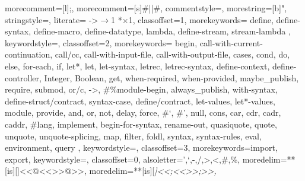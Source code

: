  {
	morecomment=[l]{;},         %
	morecomment=[s]{\#|}{|\#},  %
	commentstyle={\color{ForestGreen}\slshape\sffamily},
	morestring=[b]",
	stringstyle=\color{red},
	literate=%
		{->}{{$\rightarrow$}}1
		{*}{{$\times$}}1,
	classoffset=1,
		morekeywords={
			define, define-syntax, define-macro, define-datatype, lambda, define-stream, stream-lambda
		},
		keywordstyle=\color{purple},
	classoffset=2,
		morekeywords={
			begin, call-with-current-continuation, call/cc, call-with-input-file, call-with-output-file, 
			cases, cond, do, else, for-each, if,
			let*, let, let-syntax, letrec, letrec-syntax,
			define-context, define-controller, Integer, Boolean, get, when-required, when-provided,
			maybe_publish, require, submod, or/c, ->, \#\%module-begin, always_publish, with-syntax, define-struct/contract, syntax-case, define/contract,
			let-values, let*-values,
			module, provide,
			and, or, not, 
			delay, force,
			\#`, \#',
			null, cons, car, cdr, cadr, caddr,
			\#lang, implement, begin-for-syntax, rename-out,
			quasiquote, quote, unquote, unquote-splicing,
			map, filter, foldl, syntax, syntax-rules, eval, environment, query 
		},
		keywordstyle=\color{blue},
	classoffset=3,
		morekeywords={import, export},
		keywordstyle=\color{green},
	classoffset=0,
	alsoletter={',`,-,/,>,<,\#,\%},
	moredelim=**[is][\color{lightgray}]{<<@<<}{>>@>>},
	moredelim=**[is][\itshape\color{OliveGreen}]{<<;<<}{>>;>>},
}

\newcommand{\ir}[1]{\lstinline[basicstyle=\ttfamily\small,language=racket]{#1}}
